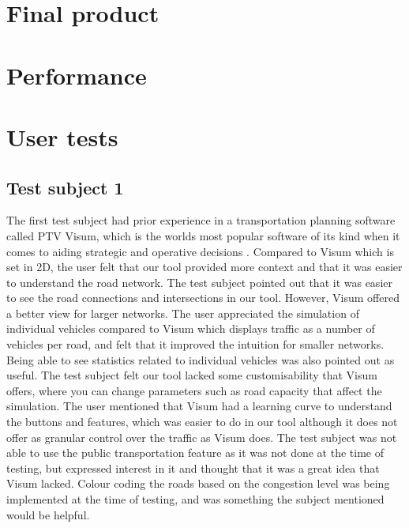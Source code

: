 
\section{Final product}

\section{Performance}

\section{User tests}
    \subsection{Test subject 1}
        The first test subject had prior experience in a transportation planning software called PTV Visum, which is the worlds most popular software of its kind when it comes to aiding strategic and operative decisions \cite{visum}. Compared to Visum which is set in 2D, the user felt that our tool provided more context and that it was easier to understand the road network. The test subject pointed out that it was easier to see the road connections and intersections in our tool. However, Visum offered a better view for larger networks. The user appreciated the simulation of individual vehicles compared to Visum which displays traffic as a number of vehicles per road, and felt that it improved the intuition for smaller networks. Being able to see statistics related to individual vehicles was also pointed out as useful. The test subject felt our tool lacked some customisability that Visum offers, where you can change parameters such as road capacity that affect the simulation. The user mentioned that Visum had a learning curve to understand the buttons and features, which was easier to do in our tool although it does not offer as granular control over the traffic as Visum does. The test subject was not able to use the public transportation feature as it was not done at the time of testing, but expressed interest in it and thought that it was a great idea that Visum lacked. Colour coding the roads based on the congestion level was being implemented at the time of testing, and was something the subject mentioned would be helpful.

